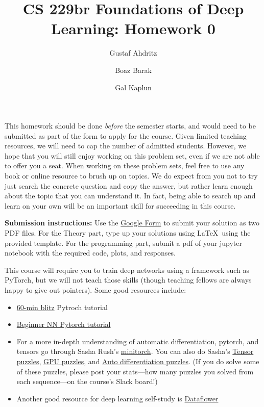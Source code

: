 \documentclass{article}
\title{CS 229br Foundations of Deep Learning: Homework 0}
\author{Gustaf Ahdritz \and Boaz Barak \and Gal Kaplun}
\theoremstyle{definition}
\begin{document}
\date{}
\maketitle{}

This homework should be done \emph{before} the semester starts, and would need to be submitted as part of the form to apply for the course. Given limited teaching resources, we will need to cap the number of admitted students. However, we hope that you will still enjoy working on this problem set, even if we are not able to offer you a seat. When working on these problem sets, feel free to use any book or online resource to brush up on topics. We do expect from you not to try just search the concrete question and copy the answer, but rather learn enough about the topic that you can understand it. In fact, being able to search up and learn on your own will be an important skill for succeeding in this course. 

\medskip 
{\color{red} \textbf{Submission instructions:} Use the \href{https://forms.gle/gjXbdCVbqxRVu6Bj6}{Google Form} to submit your solution as two PDF files. For the Theory part, type up your solutions using \LaTeX\ using the provided template. For the programming part, submit a pdf of your jupyter notebook with the required code, plots, and responses.}

\medskip
This course will require you to train deep networks using a framework such as PyTorch, but we will not teach those skills (though teaching fellows are always happy to give out pointers).  Some good resources include:


\begin{itemize}
    \item \href{https://pytorch.org/tutorials/beginner/deep_learning_60min_blitz.html}{60-min blitz} Pytroch tutorial
    \item \href{https://pytorch.org/tutorials/beginner/nn_tutorial.html}{Beginner NN Pytorch tutorial}

    \item For a more in-depth understanding of automatic differentiation, pytorch, and tensors go through Sasha Rush's \href{https://minitorch.github.io/}{minitorch}. You can also do Sasha's \href{https://github.com/srush/Tensor-Puzzles}{Tensor puzzles},  \href{https://github.com/srush/GPU-Puzzles}{GPU puzzles}, and \href{https://github.com/srush/Autodiff-Puzzles}{Auto differentiation puzzles}. (If you do solve some of these puzzles, please post your stats---how many puzzles you solved from each sequence---on the course's Slack board!)

    \item Another good  resource for deep learning self-study is \href{https://dataflowr.github.io/website/}{Dataflower}
    
\end{itemize}
\end{document}
